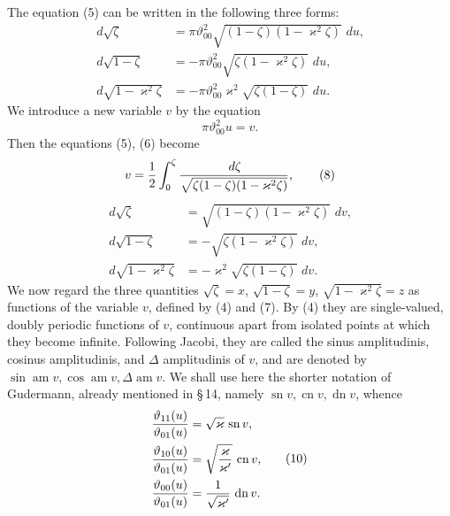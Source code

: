 \documentclass[11pt]{article}
\providecommand{\dd}{\,d}
\providecommand{\tht}{\vartheta}
\providecommand{\sn}{\operatorname{sn}}
\providecommand{\cn}{\operatorname{cn}}
\providecommand{\dn}{\operatorname{dn}}
\providecommand{\am}{\operatorname{am}}
\begin{document}
The equation (5) can be written in the following three forms:
\begin{equation}
\begin{aligned}
\dd\sqrt\zeta&=\pi\tht_{00}^{2}\sqrt{(1-\zeta)(1-\varkappa^2\zeta)}\,\dd u,\\
\dd\sqrt{1-\zeta}&=-\pi\tht_{00}^{2}\sqrt{\zeta(1-\varkappa^2\zeta)}\,\dd u,\\
\dd\sqrt{1-\varkappa^2\zeta}&=-\pi\tht_{00}^{2}\varkappa^2\sqrt{\zeta(1-\zeta)}\,\dd u.
\end{aligned}
\tag{6}
\end{equation}
We introduce a new variable $v$ by the equation
\begin{equation}
\pi\tht_{00}^{2}u=v.
\tag{7}
\end{equation}
Then the equations (5), (6) become
\begin{equation}
 v={1\over2}\int_0^\zeta {\dd\zeta\over\sqrt{\zeta(1-\zeta)(1-\varkappa^2\zeta)}},
\tag{8}
\end{equation}
\begin{equation}
\begin{aligned}
\dd\sqrt\zeta&=\sqrt{(1-\zeta)(1-\varkappa^2\zeta)}\,\dd v,\\
\dd\sqrt{1-\zeta}&=-\sqrt{\zeta(1-\varkappa^2\zeta)}\,\dd v,\\
\dd\sqrt{1-\varkappa^2\zeta}&=-\varkappa^2\sqrt{\zeta(1-\zeta)}\,\dd v.
\end{aligned}
\tag{9}
\end{equation}
We now regard the three quantities $\sqrt\zeta=x$, $\sqrt{1-\zeta}=y$, $\sqrt{1-\varkappa^2\zeta}=z$ as functions of the variable $v$, defined by (4) and (7). By (4) they are single-valued, doubly periodic functions of $v$, continuous apart from isolated points at which they become infinite. Following Jacobi, they are called the sinus amplitudinis, cosinus amplitudinis, and $\Delta$ amplitudinis of $v$, and are denoted by $\sin\am v,\cos\am v,\Delta\am v$. We shall use here the shorter notation of Gudermann, already mentioned in \S\,14, namely $\sn v,\cn v,\dn v$, whence
\begin{equation}
\begin{aligned}
{\tht_{11}(u)\over\tht_{01}(u)}&=\sqrt{\varkappa}\,\sn v,\\
{\tht_{10}(u)\over\tht_{01}(u)}&=\sqrt{\varkappa\over\varkappa'}\,\cn v,\\
{\tht_{00}(u)\over\tht_{01}(u)}&={1\over\sqrt{\varkappa'}}\,\dn v.
\end{aligned}
\tag{10}
\end{equation}
\end{document}
